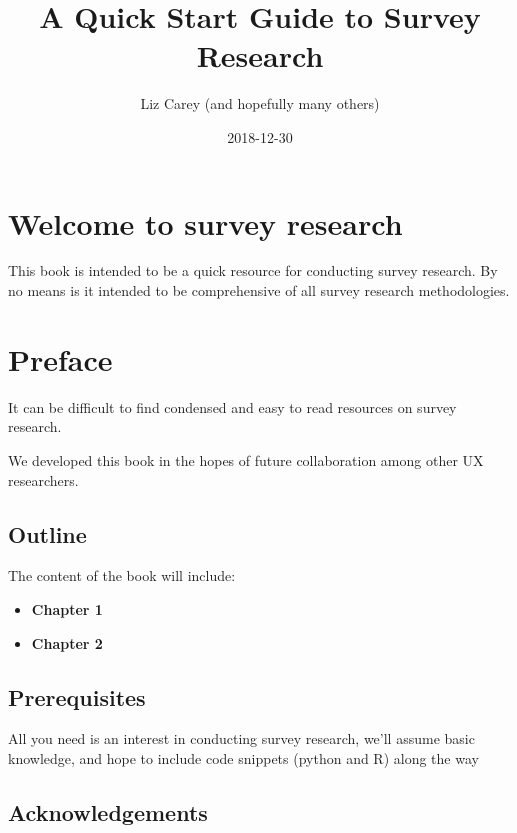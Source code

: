 \documentclass[]{book}
\title{A Quick Start Guide to Survey Research}
\author{Liz Carey (and hopefully many others)}
\date{2018-12-30}
\providecommand{\tightlist}{%
  \setlength{\itemsep}{0pt}\setlength{\parskip}{0pt}}
\theoremstyle{definition}
\theoremstyle{definition}
\theoremstyle{definition}
\theoremstyle{remark}
\begin{document}
\maketitle

{
\setcounter{tocdepth}{1}
\tableofcontents
}
\chapter*{Welcome to survey research}\label{welcome-to-survey-research}

This book is intended to be a quick resource for conducting survey
research. By no means is it intended to be comprehensive of all survey
research methodologies.

\chapter*{Preface}\label{preface}

It can be difficult to find condensed and easy to read resources on
survey research.

We developed this book in the hopes of future collaboration among other
UX researchers.

\section*{Outline}\label{outline}

The content of the book will include:

\begin{itemize}
\tightlist
\item
  \textbf{Chapter 1}
\item
  \textbf{Chapter 2}
\end{itemize}

\section*{Prerequisites}\label{prerequisites}

All you need is an interest in conducting survey research, we'll assume
basic knowledge, and hope to include code snippets (python and R) along
the way

\section*{Acknowledgements}\label{acknowledgements}
\end{document}
